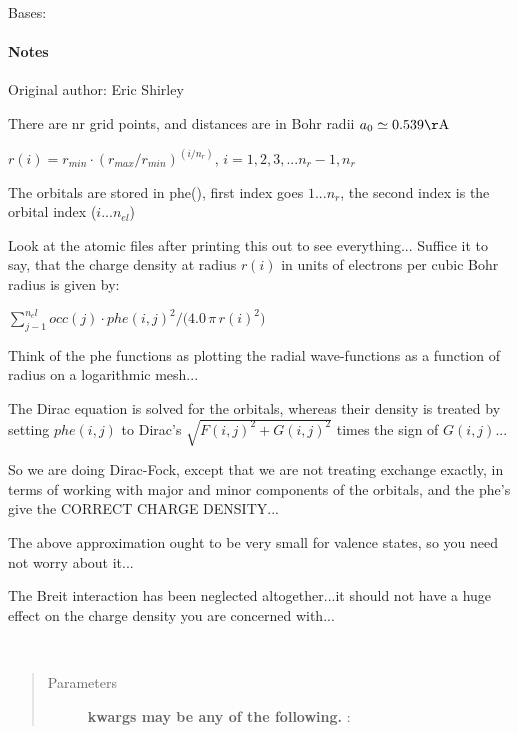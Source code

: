 \documentclass[letterpaper,10pt,english]{sphinxmanual}
\begin{document}
\begin{fulllineitems}
\label{modules:phaseshifts.atorb.Atorb}
Bases: 
\paragraph{Notes}

Original author: Eric Shirley

There are nr grid points, and distances are in Bohr radii
$a_0 \simeq 0.539 \mathrm{\AA}$

$r(i) = r_{min} \cdot (r_{max} / r_{min})^{(i/n_r)}$, 
$i=1,2,3,...n_r-1,n_r$

The orbitals are stored in phe(), first index goes $1...n_r$, the
second index is the orbital index ($i...n_{el}$)

Look at the atomic files after printing this out to see everything...
Suffice it to say, that the charge density at radius $r(i)$
in units of electrons per cubic Bohr radius is given by:

$\sum_{j-1}^{n_el}{occ(j) \cdot phe(i,j)^2 / (4.0\,\pi\,{r(i)^2)}}$

Think of the phe functions as plotting the radial wave-functions
as a function of radius on a logarithmic mesh...

The Dirac equation is solved for the orbitals, whereas their density
is treated by setting $phe(i,j)$ to Dirac's 
$\sqrt{F(i,j)^2 + G(i,j)^2}$ times the sign of $G(i,j)$...

So we are doing Dirac-Fock, except that we are not treating exchange 
exactly, in terms of working with major and minor components of the 
orbitals, and the phe's give the CORRECT CHARGE DENSITY...

The above approximation ought to be very small for valence states,
so you need not worry about it...

The Breit interaction has been neglected altogether...it should not 
have a huge effect on the charge density you are concerned with...

\begin{fulllineitems}
\label{modules:phaseshifts.atorb.Atorb.calculate_Q_density}~\begin{quote}\begin{description}
\item[{Parameters}] \leavevmode
\textbf{kwargs may be any of the following.} :


\end{description}
\end{quote}
\end{fulllineitems}
\end{fulllineitems}
\end{document}
